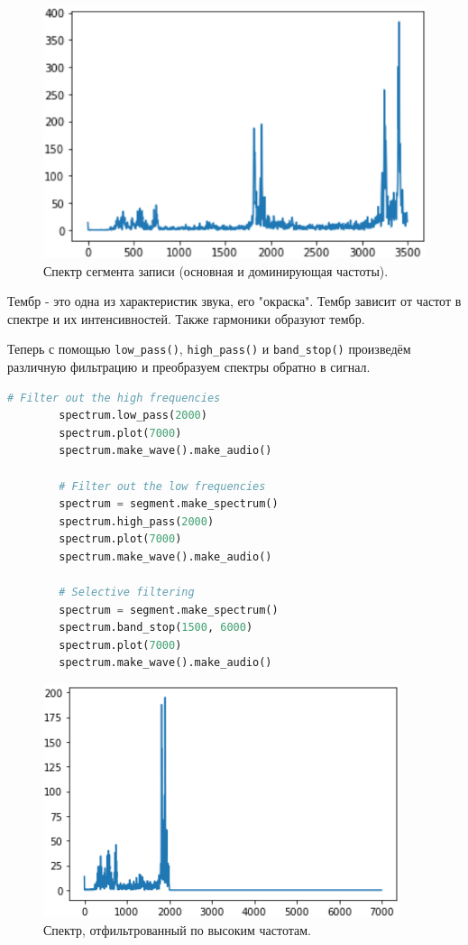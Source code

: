 \documentclass[a4paper, 14pt]{extarticle}
\begin{document}
    \begin{figure}[H]
        \centering
        \includegraphics[width=0.7\linewidth]{resources/Images/task2_small_spectrum}
        \caption{Спектр сегмента записи (основная и доминирующая частоты).}
        \label{fig:task2_small_spectrum}
    \end{figure}

    Тембр - это одна из характеристик звука, его "окраска". Тембр зависит от частот в спектре и их интенсивностей.
    Также гармоники образуют тембр.

    Теперь с помощью \texttt{low\_pass()}, \texttt{high\_pass()} и \texttt{band\_stop()} произведём различную фильтрацию и преобразуем спектры обратно в сигнал.

    \begin{lstlisting}[language=Python, caption= Фильтрация гармоник., label={lst:task2_filter}]
        # Filter out the high frequencies
        spectrum.low_pass(2000)
        spectrum.plot(7000)
        spectrum.make_wave().make_audio()

        # Filter out the low frequencies
        spectrum = segment.make_spectrum()
        spectrum.high_pass(2000)
        spectrum.plot(7000)
        spectrum.make_wave().make_audio()

        # Selective filtering
        spectrum = segment.make_spectrum()
        spectrum.band_stop(1500, 6000)
        spectrum.plot(7000)
        spectrum.make_wave().make_audio()
    \end{lstlisting}

    \begin{figure}[H]
        \centering
        \includegraphics[width=0.8\linewidth]{resources/Images/task2_fiter_low_pass}
        \caption{Спектр, отфильтрованный по высоким частотам.}
        \label{fig:task2_fiter_low_pass}
    \end{figure}
\end{document}
